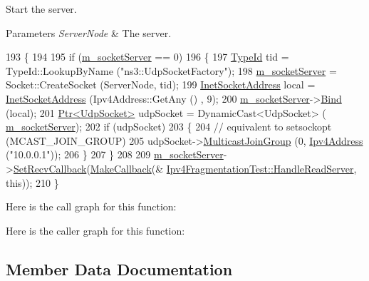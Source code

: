 Start the server. 


\begin{DoxyParams}{Parameters}
{\em Server\+Node} & The server. \\
\hline
\end{DoxyParams}

\begin{DoxyCode}
193 \{
194 
195   \textcolor{keywordflow}{if} (\hyperlink{classIpv4FragmentationTest_a5960ce9f8f50e1635921f941c0388f15}{m\_socketServer} == 0)
196     \{
197       \hyperlink{classns3_1_1TypeId}{TypeId} tid = TypeId::LookupByName (\textcolor{stringliteral}{"ns3::UdpSocketFactory"});
198       \hyperlink{classIpv4FragmentationTest_a5960ce9f8f50e1635921f941c0388f15}{m\_socketServer} = Socket::CreateSocket (ServerNode, tid);
199       \hyperlink{classns3_1_1InetSocketAddress}{InetSocketAddress} local = \hyperlink{classns3_1_1InetSocketAddress}{InetSocketAddress} (Ipv4Address::GetAny ()
      , 9);
200       \hyperlink{classIpv4FragmentationTest_a5960ce9f8f50e1635921f941c0388f15}{m\_socketServer}->\hyperlink{classns3_1_1Socket_ada93439a43de2028b5a8fc6621dad482}{Bind} (local);
201       \hyperlink{classns3_1_1Ptr}{Ptr<UdpSocket>} udpSocket = DynamicCast<UdpSocket> (
      \hyperlink{classIpv4FragmentationTest_a5960ce9f8f50e1635921f941c0388f15}{m\_socketServer});
202       \textcolor{keywordflow}{if} (udpSocket)
203         \{
204           \textcolor{comment}{// equivalent to setsockopt (MCAST\_JOIN\_GROUP)}
205           udpSocket->\hyperlink{classns3_1_1UdpSocket_a3aa48fac00edf4dbd519a6fc7644f0b7}{MulticastJoinGroup} (0, \hyperlink{classns3_1_1Ipv4Address}{Ipv4Address} (\textcolor{stringliteral}{"10.0.0.1"}));
206         \}
207    \}
208 
209   \hyperlink{classIpv4FragmentationTest_a5960ce9f8f50e1635921f941c0388f15}{m\_socketServer}->\hyperlink{classns3_1_1Socket_a243f7835ef1a85f9270fd3577e3a40da}{SetRecvCallback}(\hyperlink{group__makecallbackmemptr_ga9376283685aa99d204048d6a4b7610a4}{MakeCallback}(&
      \hyperlink{classIpv4FragmentationTest_ae96faa04d6aa0facdf1fbbabb1e3af01}{Ipv4FragmentationTest::HandleReadServer}, \textcolor{keyword}{this}));
210 \}
\end{DoxyCode}


Here is the call graph for this function\+:




Here is the caller graph for this function\+:




\subsection{Member Data Documentation}
